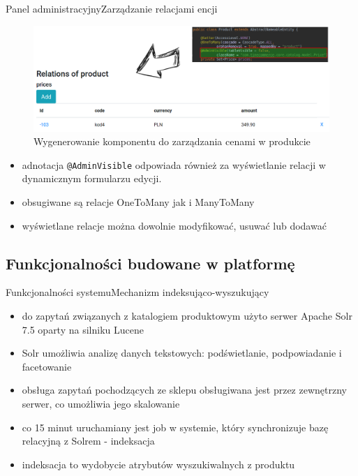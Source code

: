 \documentclass[polish,xcolor=table,9pt,aspectratio=1610,hyperref={pdfpagemode=FullScreen}]{beamer}
\begin{document}
\begin{frame}{Panel administracyjny}{Zarządzanie relacjami encji}

	\begin{figure}
		\begin{center}
			\includegraphics[scale=0.25]{relacjeWDFE.png}
		\end{center}
		\caption{{\color{black}Wygenerowanie komponentu do zarządzania cenami w produkcie}} 
	\end{figure}
\begin{itemize}
	\item<1-> adnotacja \texttt{@AdminVisible} odpowiada również za wyświetlanie relacji w dynamicznym formularzu edycji. 
	\item<1-> obsugiwane są relacje OneToMany jak i ManyToMany
	\item<1-> wyświetlane relacje można dowolnie modyfikować, usuwać lub dodawać
\end{itemize}
\end{frame}



\subsection{Funkcjonalności budowane w platformę}

\begin{frame}{Funkcjonalności systemu}{Mechanizm indeksująco-wyszukujący}
\begin{itemize}
	\item<1-> do zapytań związanych z katalogiem produktowym użyto serwer Apache Solr 7.5 oparty na silniku Lucene
	\item<1-> Solr umożliwia analizę danych tekstowych: podświetlanie, podpowiadanie i facetowanie 
	\item<1-> obsługa zapytań pochodzących ze sklepu obsługiwana jest przez zewnętrzny serwer, co umożliwia jego skalowanie
	\item<1-> co 15 minut uruchamiany jest job w systemie, który synchronizuje bazę relacyjną z Solrem - indeksacja
	\item<1-> indeksacja to wydobycie atrybutów wyszukiwalnych z produktu
\end{itemize}
\end{frame}
\end{document}
